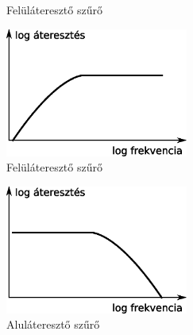 \documentclass[12pt,a4paper]{article}
\begin{document}
\begin{figure}[H]
\label{fig:felul}
\centering
{}
\caption{Felüláteresztő szűrő} 
\end{figure}
\vspace{0.5cm}
\begin{center}
\begin{minipage}{.5\textwidth}

\begin{figure}[H]
\begin{center}
\includegraphics[width=6cm]{figures/szurok_felul.eps}
\caption{Felüláteresztő szűrő}
\label{fig:felulk}
\end{center}
\end{figure}
\end{minipage}%
\begin{minipage}{.5\textwidth}
\begin{figure}[H]
\begin{center}
\includegraphics[width=6cm]{figures/szurok_alul.eps}
\caption{Aluláteresztő szűrő}
\label{fig:alulk}
\end{center}
\end{figure}
\end{minipage}
\end{center}
\newpage
\end{document}
